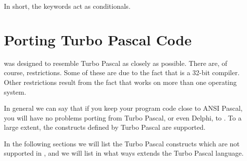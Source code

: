 \documentclass{report}
\begin{document}
In short, the  keywords act as conditionals.



\chapter{Porting Turbo Pascal Code}

\fpc was designed to resemble Turbo Pascal as closely as possible. There
are, of course, restrictions. Some of these are due to the fact that \fpc is
a 32-bit compiler. Other restrictions result from the fact that \fpc works
on more than one operating system.

In general we can say that if you keep your program code close to ANSI
Pascal, you will have no problems porting from Turbo Pascal, or even Delphi, to
\fpc. To a large extent, the constructs defined by Turbo Pascal are
supported.

In the following sections we will list the Turbo Pascal constructs which are
not supported in \fpc, and we will list in what ways \fpc extends the Turbo
Pascal language.


\end{document}
